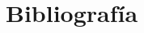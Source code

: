 \section{Bibliografía}
\label{sec:bibliografia}

\begingroup
\renewcommand{\section}[2]{}
\raggedright


\endgroup
